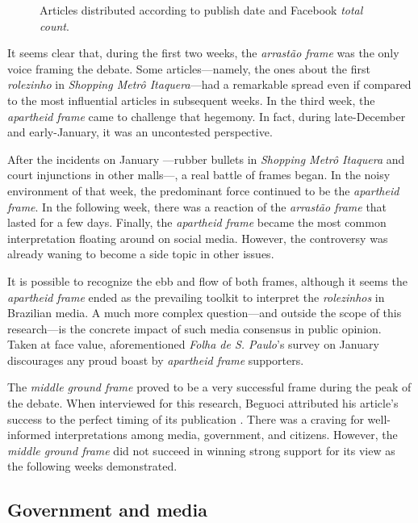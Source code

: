 \begin{figure}
\centering

\caption{Articles distributed according to publish date and Facebook \emph{total count}.}\label{fig:cap4-5}
\end{figure} 

It seems clear that, during the first two weeks, the \emph{arrastão frame} was the only voice framing the debate. Some articles---namely, the ones about the first \emph{rolezinho} in \emph{Shopping Metrô Itaquera}---had a remarkable spread even if compared to the most influential articles in subsequent weeks. In the third week, the \emph{apartheid frame} came to challenge that hegemony. In fact, during late-December and early-January, it was an uncontested perspective.

After the incidents on January ---rubber bullets in \emph{Shopping Metrô Itaquera} and court injunctions in other malls---, a real battle of frames began. In the noisy environment of that week, the predominant force continued to be the \emph{apartheid frame}. In the following week, there was a reaction of the \emph{arrastão frame} that lasted for a few days. Finally, the \emph{apartheid frame} became the most common interpretation floating around on social media. However, the controversy was already waning to become a side topic in other issues.

It is possible to recognize the ebb and flow of both frames, although it seems the \emph{apartheid frame} ended as the prevailing toolkit to interpret the \emph{rolezinhos} in Brazilian media. A much more complex question---and outside the scope of this research---is the concrete impact of such media consensus in public opinion. Taken at face value, aforementioned \emph{Folha de S. Paulo}'s survey on January  \autocite{folha_datafolha} discourages any proud boast by \emph{apartheid frame} supporters.

The \emph{middle ground frame} proved to be a very successful frame during the peak of the debate. When interviewed for this research, Beguoci attributed his article's success to the perfect timing of its publication \autocite{interview_beguoci}. There was a craving for well-informed interpretations among media, government, and citizens. However, the \emph{middle ground frame} did not succeed in winning strong support for its view as the following weeks demonstrated.

\subsection*{Government and media}

